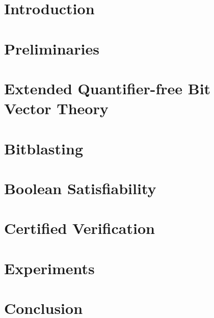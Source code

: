 \documentclass[10pt,conference,letterpaper]{IEEEtran}
\begin{document}

\section{Introduction}
\label{section:introduction}

\section{Preliminaries}
\label{section:preliminaries}

\section{\cryptoline}
\label{section:cryptoline}



\section{Extended Quantifier-free Bit Vector Theory}
\label{section:qfbv-semantics}

\section{Bitblasting}
\label{section:bitblasting}

\section{Boolean Satisfiability}
\label{section:sat}

\section{Certified Verification}
\label{section:certified-verification}

\section{Experiments}
\label{section:experiments}

\section{Conclusion}
\label{section:conclusion}



\end{document}
